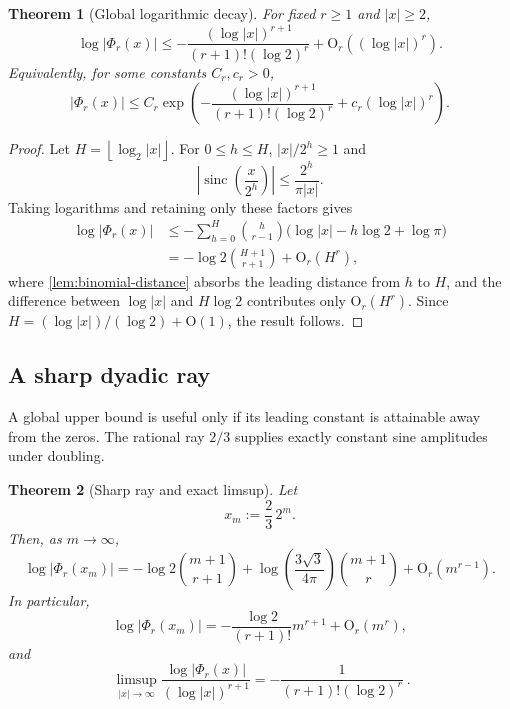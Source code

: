 \documentclass[11pt,a4paper]{article}
\theoremstyle{frontier}
\newtheorem{theorem}{Theorem}[section]
\theoremstyle{definition}
\newcommand{\sinc}{\operatorname{sinc}}
\newcommand{\floor}[1]{\left\lfloor #1\right\rfloor}
\newcommand{\bigO}{\mathrm O}
\begin{document}
\begin{theorem}[Global logarithmic decay]\label{thm:global-fourier-decay}
For fixed $r\ge1$ and $|x|\ge2$,
\begin{equation}\label{eq:global-fourier-decay}
 \log|\Phi_r(x)|
 \le -\frac{(\log|x|)^{r+1}}
 {(r+1)!(\log2)^r}
 +\bigO_r((\log|x|)^r).
\end{equation}
Equivalently, for some constants $C_r,c_r>0$,
\begin{equation}\label{eq:global-fourier-exp}
 |\Phi_r(x)|
 \le C_r\exp\!\left(
 -\frac{(\log|x|)^{r+1}}
 {(r+1)!(\log2)^r}
 +c_r(\log|x|)^r\right).
\end{equation}
\end{theorem}

\begin{proof}
Let $H=\floor{\log_2|x|}$.  For $0\le h\le H$,
$|x|/2^h\ge1$ and
\[
 \left|\sinc\!\left(\frac x{2^h}\right)\right|
 \le\frac{2^h}{\pi|x|}.
\]
Taking logarithms and retaining only these factors gives
\begin{align*}
 \log|\Phi_r(x)|
 &\le -\sum_{h=0}^{H}\binom h{r-1}
   \bigl(\log|x|-h\log2+\log\pi\bigr)\\
 &=-\log2\binom{H+1}{r+1}+\bigO_r(H^r),
\end{align*}
where \cref{lem:binomial-distance} absorbs the leading distance from $h$ to $H$, and the difference between $\log|x|$ and $H\log2$ contributes only $\bigO_r(H^r)$.  Since $H=(\log|x|)/(\log2)+\bigO(1)$, the result follows.
\end{proof}

\subsection{A sharp dyadic ray}

A global upper bound is useful only if its leading constant is attainable away from the zeros.  The rational ray $2/3$ supplies exactly constant sine amplitudes under doubling.

\begin{theorem}[Sharp ray and exact limsup]\label{thm:sharp-ray}
Let
\begin{equation}\label{eq:sharp-ray}
  x_m:=\frac23\,2^m.
\end{equation}
Then, as $m\to\infty$,
\begin{equation}\label{eq:sharp-ray-two-term}
 \log|\Phi_r(x_m)|
 =-\log2\binom{m+1}{r+1}
 +\log\!\left(\frac{3\sqrt3}{4\pi}\right)
  \binom{m+1}{r}
 +\bigO_r(m^{r-1}).
\end{equation}
In particular,
\begin{equation}\label{eq:sharp-ray-leading}
 \log|\Phi_r(x_m)|
 =-\frac{\log2}{(r+1)!}m^{r+1}+\bigO_r(m^r),
\end{equation}
and
\begin{equation}\label{eq:fourier-limsup}
 \boxed{\ 
 \limsup_{|x|\to\infty}
 \frac{\log|\Phi_r(x)|}{(\log|x|)^{r+1}}
 =-\frac1{(r+1)!(\log2)^r}
 \ }.
\end{equation}
\end{theorem}
\end{document}
